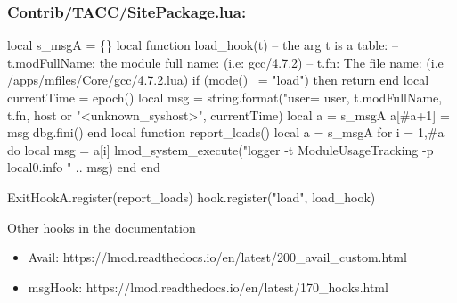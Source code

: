 \documentclass{beamer}
\begin{document}
\begin{frame}[fragile]
  \frametitle{Contrib/TACC/SitePackage.lua: }
    {\tiny
\begin{semiverbatim}
local s\_msgA = \{\}
local function load_hook(t)
   -- the arg t is a table:
   --     t.modFullName:  the module full name: (i.e: gcc/4.7.2)
   --     t.fn:           The file name: (i.e /apps/mfiles/Core/gcc/4.7.2.lua)
   if (mode() ~= "load") then return end
   local currentTime = epoch()
   local msg         = string.format("user=%
                                     user, t.modFullName, t.fn, 
                                     host or "<unknown_syshost>", currentTime)
   local a           = s\_msgA
   a[#a+1]           = msg
   dbg.fini()
end
local function report_loads()
   local a = s\_msgA
   for i = 1,#a do
      local msg = a[i]
      lmod_system_execute("logger -t ModuleUsageTracking -p local0.info " .. msg)
   end
end

ExitHookA.register(report_loads)
hook.register("load",           load_hook)
\end{semiverbatim}
    }
\end{frame}


\begin{frame}{Other hooks in the documentation}
  \begin{itemize}
    \item Avail: https://lmod.readthedocs.io/en/latest/200_avail_custom.html
    \item msgHook: https://lmod.readthedocs.io/en/latest/170_hooks.html
  \end{itemize}
\end{frame}
\end{document}
